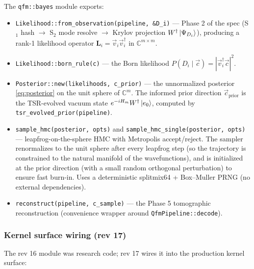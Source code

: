 \documentclass[11pt, a4paper]{article}
\newcommand{\Cset}{\mathbb{C}}
\begin{document}
The \texttt{qfm::bayes} module exports:

\begin{itemize}
\item \texttt{Likelihood::from\_observation(pipeline, \&D\_i)} ---
  Phase 2 of the spec (S$_1$ hash $\to$ S$_2$ mode resolve $\to$
  Krylov projection $W^\dagger\ket{\Psi_{D_i}}$), producing a
  rank-1 likelihood operator $\mathbf L_i = \vec v_i \vec
  v_i^\dagger$ in $\Cset^{m\times m}$.
\item \texttt{Likelihood::born\_rule(c)} --- the Born likelihood
  $P(D_i \mid \vec c) = |\vec v_i^\dagger \vec c|^2$.
\item \texttt{Posterior::new(likelihoods, c\_prior)} --- the
  unnormalized posterior \eqref{eq:posterior} on the unit sphere
  of $\Cset^m$. The informed prior direction $\vec c_{\mathrm{prior}}$
  is the TSR-evolved vacuum state
  $e^{-iH_m}W^\dagger\ket{e_0}$, computed by
  \texttt{tsr\_evolved\_prior(pipeline)}.
\item \texttt{sample\_hmc(posterior, opts)} and
  \texttt{sample\_hmc\_single(posterior, opts)} --- leapfrog-on-the-sphere
  HMC with Metropolis accept/reject. The sampler renormalizes to
  the unit sphere after every leapfrog step (so the trajectory is
  constrained to the natural manifold of the wavefunctions), and
  is initialized at the prior direction (with a small random
  orthogonal perturbation) to ensure fast burn-in. Uses a
  deterministic splitmix64 + Box--Muller PRNG (no external
  dependencies).
\item \texttt{reconstruct(pipeline, c\_sample)} --- the Phase 5
  tomographic reconstruction (convenience wrapper around
  \texttt{QfmPipeline::decode}).
\end{itemize}

\subsubsection*{Kernel surface wiring (rev 17)}

The rev 16 module was research code; rev 17 wires it into the
production kernel surface:
\end{document}
